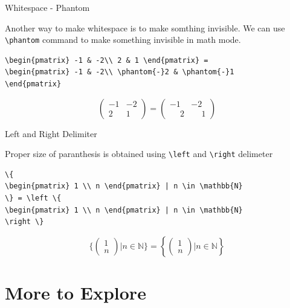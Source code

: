\documentclass[10pt]{beamer}
\begin{document}
\begin{frame}[fragile]{Whitespace - Phantom}
\begin{tcolorbox}[width=\textwidth, colframe=red]
Another way to make whitespace is to make somthing invisible. We can use \verb|\phantom| command to make something invisible in math mode.
\end{tcolorbox}
\begin{verbatim}
\begin{pmatrix} -1 & -2\\ 2 & 1 \end{pmatrix} = 
\begin{pmatrix} -1 & -2\\ \phantom{-}2 & \phantom{-}1
\end{pmatrix}
\end{verbatim}
$$\begin{pmatrix} -1 & -2 \\ 2 & 1 \end{pmatrix} = \begin{pmatrix} -1 & -2 \\ \phantom{-}2 & \phantom{-}1\end{pmatrix}$$
\end{frame}

\begin{frame}[fragile]{Left and Right Delimiter}
\begin{tcolorbox}[width=\textwidth, colframe=red]
Proper size of paranthesis is obtained using \verb|\left| and \verb|\right| delimeter
\end{tcolorbox}
\begin{verbatim}
\{ 
\begin{pmatrix} 1 \\ n \end{pmatrix} | n \in \mathbb{N} 
\} = \left \{ 
\begin{pmatrix} 1 \\ n \end{pmatrix} | n \in \mathbb{N} 
\right \}
\end{verbatim}
$$\{ \begin{pmatrix} 1 \\ n \end{pmatrix} | n \in \mathbb{N} \} = \left \{ 
\begin{pmatrix} 1 \\ n \end{pmatrix} | n \in \mathbb{N} 
\right \}$$
\end{frame}

\section{More to Explore}
\end{document}
